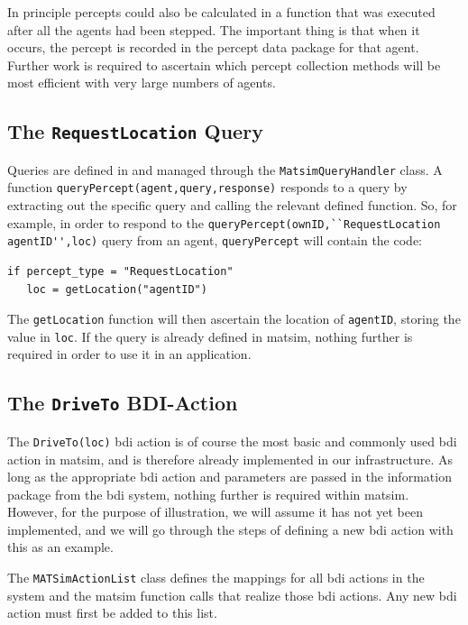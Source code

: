 In principle percepts could also be calculated in a function that was
executed after all the agents had been stepped. The important thing is
that when it occurs, the percept is recorded in the percept data
package for that agent. Further work is required to ascertain which
percept collection methods will be most efficient with very large
numbers of agents.

\subsection{The \lstinline{RequestLocation} Query}
Queries are defined in and managed through the \lstinline{MatsimQueryHandler}
class.
A function \lstinline{queryPercept(agent,query,response)} responds to a query by
extracting out the specific query and calling the relevant defined
function. So, for example, in order to respond to the
\lstinline{queryPercept(ownID,``RequestLocation agentID'',loc)} query from an
agent, \lstinline{queryPercept} will contain the code:
\begin{lstlisting}
if percept_type = "RequestLocation"
   loc = getLocation("agentID")
\end{lstlisting}
The \lstinline{getLocation} function will then ascertain the location of
\lstinline{agentID}, storing the value in \lstinline{loc}. 
%
If the query is already defined in \gls{matsim}, nothing further is required
in order to use it in an application.

\subsection{The \lstinline{DriveTo} BDI-Action}
The \lstinline{DriveTo(loc)} \gls{bdi} action is of course the most basic and
commonly used \gls{bdi} action in \gls{matsim}, and is therefore already
implemented in our infrastructure. As long as the appropriate \gls{bdi}
action and parameters are passed in the information package from the
\gls{bdi} system, nothing further is required within \gls{matsim}. However, for
the purpose of illustration, we will assume it has not yet been
implemented, and we will go through the steps of defining a new \gls{bdi}
action with this as an example.

The \lstinline{MATSimActionList} class defines the mappings for all \gls{bdi}
actions in the system and the \gls{matsim} function calls that realize those
\gls{bdi} actions.  Any new \gls{bdi} action must first be added to this list.

